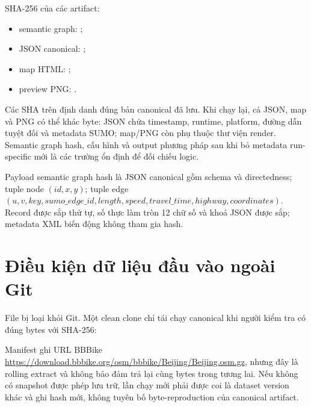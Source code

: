 \documentclass[12pt,a4paper,oneside]{report}
\begin{document}
SHA-256 của các artifact:

\begin{itemize}
  \item semantic graph:\newline
        \small{}\normalsize;
  \item JSON canonical:\newline
        \small{}\normalsize;
  \item map HTML:\newline
        \small{}\normalsize;
  \item preview PNG:\newline
        \small{}\normalsize.
\end{itemize}
Các SHA trên định danh đúng bản canonical đã lưu. Khi chạy lại, cả JSON, map và PNG có thể khác byte: JSON chứa timestamp, runtime, platform, đường dẫn tuyệt đối và metadata SUMO; map/PNG còn phụ thuộc thư viện render. Semantic graph hash, cấu hình và output phương pháp sau khi bỏ metadata run-specific mới là các trường ổn định để đối chiếu logic.

Payload semantic graph hash là JSON canonical gồm schema và directedness; tuple node $(id,x,y)$; tuple edge $(u,v,key,\allowbreak sumo\_edge\_id,\allowbreak length,\allowbreak speed,\allowbreak travel\_time,\allowbreak highway,\allowbreak coordinates)$. Record được sắp thứ tự, số thực làm tròn 12 chữ số và khoá JSON được sắp; metadata XML biến động không tham gia hash.

\section{Điều kiện dữ liệu đầu vào ngoài Git}

File  bị loại khỏi Git. Một clean clone chỉ tái chạy canonical khi người kiểm tra có đúng bytes với SHA-256:

\noindent\small{}\normalsize

Manifest ghi URL BBBike
\url{https://download.bbbike.org/osm/bbbike/Beijing/Beijing.osm.gz}, nhưng đây là rolling extract và không bảo đảm trả lại cùng bytes trong tương lai. Nếu không có snapshot được phép lưu trữ, lần chạy mới phải được coi là dataset version khác và ghi hash mới, không tuyên bố byte-reproduction của canonical artifact.
\end{document}
